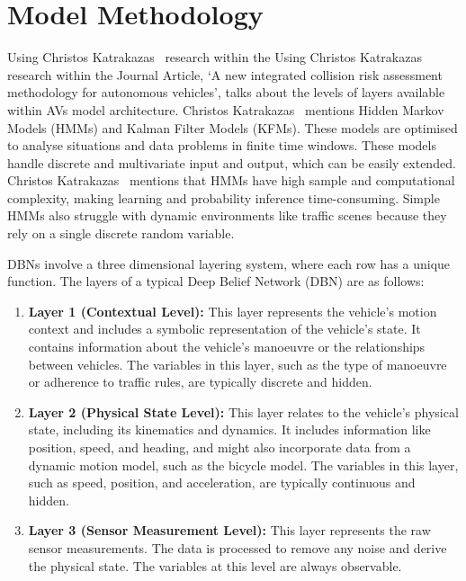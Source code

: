 \documentclass[12pt]{report} %
\begin{document}
	\section{Model Methodology}
		Using Christos Katrakazas~\cite{katrakazas_new_2019} research within the Using Christos Katrakazas~\cite{katrakazas_new_2019} research within the Journal Article, `A new integrated collision risk assessment methodology for autonomous vehicles', talks about the levels of layers available within AVs model architecture. Christos Katrakazas~\cite{katrakazas_new_2019} mentions Hidden Markov Models (HMMs) and Kalman Filter Models (KFMs). These models are optimised to analyse situations and data problems in finite time windows. These models handle discrete and multivariate input and output, which can be easily extended. Christos Katrakazas~\cite{katrakazas_new_2019} mentions that HMMs have high sample and computational complexity, making learning and probability inference time-consuming. Simple HMMs also struggle with dynamic environments like traffic scenes because they rely on a single discrete random variable.

		DBNs involve a three dimensional layering system, where each row has a unique function. The layers of a typical Deep Belief Network (DBN) are as follows:
		\begin{enumerate}
			\item \textbf{Layer 1 (Contextual Level):} This layer represents the vehicle's motion context and includes a symbolic representation of the vehicle's state. It contains information about the vehicle's manoeuvre or the relationships between vehicles. The variables in this layer, such as the type of manoeuvre or adherence to traffic rules, are typically discrete and hidden.~\cite{katrakazas_new_2019}
			\item \textbf{Layer 2 (Physical State Level):} This layer relates to the vehicle's physical state, including its kinematics and dynamics. It includes information like position, speed, and heading, and might also incorporate data from a dynamic motion model, such as the bicycle model. The variables in this layer, such as speed, position, and acceleration, are typically continuous and hidden.~\cite{katrakazas_new_2019}
			\item \textbf{Layer 3 (Sensor Measurement Level):} This layer represents the raw sensor measurements. The data is processed to remove any noise and derive the physical state. The variables at this level are always observable.~\cite{katrakazas_new_2019}
		\end{enumerate}
\end{document}
